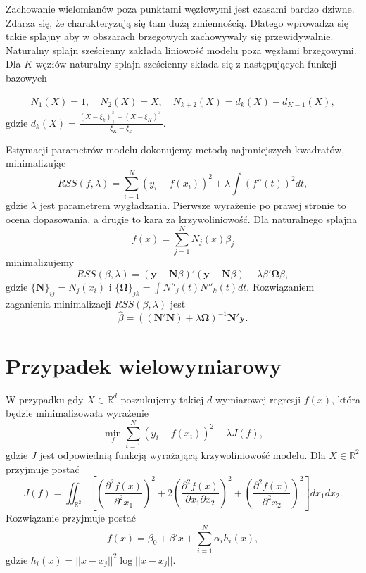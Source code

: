 \documentclass[
]{book}
\theoremstyle{plain}
\theoremstyle{definition}
\theoremstyle{definition}
\theoremstyle{definition}
\theoremstyle{definition}
\theoremstyle{remark}
\begin{document}
Zachowanie wielomianów poza punktami węzłowymi jest czasami bardzo dziwne. Zdarza się, że charakteryzują się tam dużą zmiennością. Dlatego wprowadza się takie splajny aby w obszarach brzegowych zachowywały się przewidywalnie.
Naturalny splajn sześcienny zakłada liniowość modelu poza węzłami brzegowymi. Dla \(K\) węzłów naturalny splajn sześcienny składa się z następujących funkcji bazowych

\begin{gather}
    N_1(X)=1,\quad N_2(X)=X,\quad N_{k+2}(X)=d_k(X)-d_{K-1}(X),
\end{gather}
gdzie \(d_k(X)=\frac{(X-\xi_k)^3_+-(X-\xi_K)^3_+}{\xi_K-\xi_k}.\)

Estymacji parametrów modelu dokonujemy metodą najmniejszych kwadratów, minimalizując
\begin{equation}
    RSS(f,\lambda) = \sum_{i=1}^N(y_i-f(x_i))^2+\lambda\int(f''(t))^2dt,
\end{equation}
gdzie \(\lambda\) jest parametrem wygładzania. Pierwsze wyrażenie po prawej stronie to ocena dopasowania, a drugie to kara za krzywoliniowość.
Dla naturalnego splajna
\begin{equation}
    f(x)=\sum_{j=1}^NN_j(x)\beta_j
\end{equation}
minimalizujemy
\begin{equation}
    RSS(\beta, \lambda)=(\boldsymbol y -\boldsymbol N\beta)'(\boldsymbol y-\boldsymbol N\beta)+\lambda\beta'\boldsymbol \Omega \beta,
\end{equation}
gdzie \(\{\boldsymbol N\}_{ij}= N_j(x_i)\) i \(\{\boldsymbol \Omega\}_{jk}=\int N''_j(t)N''_k(t)dt\). Rozwiązaniem zaganienia minimalizacji \(RSS(\beta,\lambda)\) jest
\begin{equation}
    \hat{\beta}=((\boldsymbol N'\boldsymbol N)+\lambda\boldsymbol \Omega)^{-1}\boldsymbol N'\boldsymbol y.
\end{equation}

\hypertarget{przypadek-wielowymiarowy}{%
\section{Przypadek wielowymiarowy}\label{przypadek-wielowymiarowy}}

W przypadku gdy \(X\in \mathbb{R}^d\) poszukujemy takiej \(d\)-wymiarowej regresji \(f(x)\), która będzie minimalizowała wyrażenie
\begin{equation}
    \min_f\sum_{i=1}^N(y_i-f(x_i))^2+\lambda J(f),
\end{equation}
gdzie \(J\) jest odpowiednią funkcją wyrażającą krzywoliniowość modelu. Dla \(X\in \mathbb{R}^2\) przyjmuje postać
\begin{equation}
    J(f)=\iint_{\mathbb{R}^2}\left[\left(\frac{\partial^2 f(x)}{\partial^2 x_1}\right)^2+2\left(\frac{\partial^2 f(x)}{\partial x_1\partial x_2}\right)^2+
    \left(\frac{\partial^2 f(x)}{\partial^2 x_2}\right)^2\right]dx_1dx_2.
\end{equation}
Rozwiązanie przyjmuje postać
\begin{equation}
    f(x) = \beta_0+\beta'x+\sum_{i=1}^N \alpha_ih_i(x),
\end{equation}
gdzie \(h_i(x)=||x-x_j||^2\log||x-x_j||\).
\end{document}
